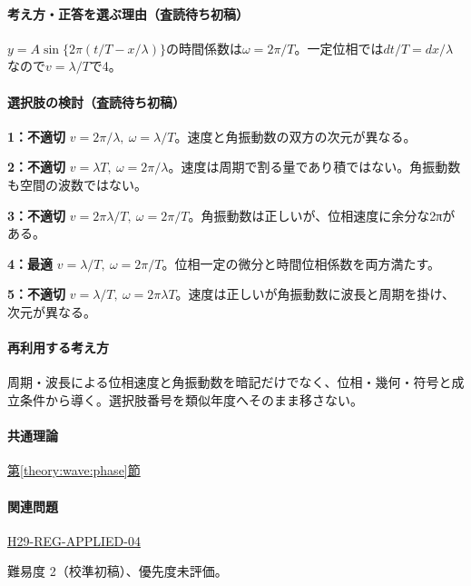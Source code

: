 \paragraph{考え方・正答を選ぶ理由（査読待ち初稿）} \(y=A\sin\{2\pi(t/T-x/\lambda)\}\)の時間係数は\(\omega=2\pi/T\)。一定位相では\(dt/T=dx/\lambda\)なので\(v=\lambda/T\)で4。

\paragraph{選択肢の検討（査読待ち初稿）}\mbox{}\par

\noindent\textbf{1：不適切} \(v=2\pi/\lambda,\ \omega=\lambda/T\)。速度と角振動数の双方の次元が異なる。\par

\noindent\textbf{2：不適切} \(v=\lambda T,\ \omega=2\pi/\lambda\)。速度は周期で割る量であり積ではない。角振動数も空間の波数ではない。\par

\noindent\textbf{3：不適切} \(v=2\pi\lambda/T,\ \omega=2\pi/T\)。角振動数は正しいが、位相速度に余分な2πがある。\par

\noindent\textbf{4：最適} \(v=\lambda/T,\ \omega=2\pi/T\)。位相一定の微分と時間位相係数を両方満たす。\par

\noindent\textbf{5：不適切} \(v=\lambda/T,\ \omega=2\pi\lambda T\)。速度は正しいが角振動数に波長と周期を掛け、次元が異なる。\par

\paragraph{再利用する考え方} 周期・波長による位相速度と角振動数を暗記だけでなく、位相・幾何・符号と成立条件から導く。選択肢番号を類似年度へそのまま移さない。

\paragraph{共通理論} \hyperref[theory:wave:phase]{第\ref*{theory:wave:phase}節}

\paragraph{関連問題} \hyperref[q:h29-reg-applied-04]{H29-REG-APPLIED-04}

\par 難易度 2（校準初稿）、優先度未評価。
